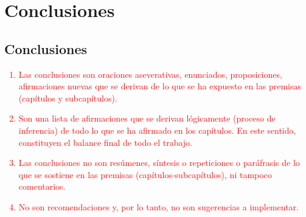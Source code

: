 \chapter{Conclusiones}
\thispagestyle{empty}

\section{Conclusiones}

\textcolor{red}{\begin{enumerate}
	\item Las conclusiones son oraciones aseverativas, enunciados, proposiciones, afirmaciones nuevas que se derivan de lo que se ha expuesto en las premisas (capítulos y subcapítulos).
	\item Son una lista de afirmaciones que se derivan lógicamente (proceso de inferencia) de todo lo que se ha afirmado en los capítulos. En este sentido, constituyen el balance final de todo el trabajo.
	\item Las conclusiones no son resúmenes, síntesis o repeticiones o paráfrasis de lo que se sostiene en las premisas (capítulos-subcapítulos), ni tampoco comentarios.
	\item No son recomendaciones y, por lo tanto, no son sugerencias a implementar.
\end{enumerate}}

